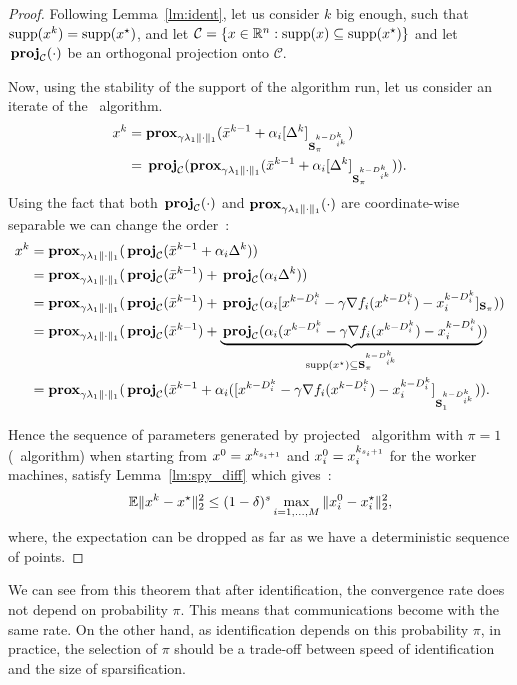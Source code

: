 \begin{proof}
Following Lemma~\ref{lm:ident}, let us consider $k$ big enough, such that $\mathrm{supp}(x^k) = \mathrm{supp}(x^\star)$, and let $\mathcal{C} = \{x\in\mathbb{R}^n:\mathrm{supp}(x)\subseteq\mathrm{supp}(x^\star)\}$
and let $\cproj(\cdot)$ be an orthogonal projection onto $\mathcal{C}$.

Now, using the stability of the support of the algorithm run, let us consider an iterate of the \SP~algorithm.
\begin{align*}
\w^k &= \lprox(\barw^{k-1} + \alpha_i[\Delta^k]_{\mask^{k-D_{i^k}^k}}) \\
&= \cproj(\lprox(\barw^{k-1} + \alpha_i[\Delta^k]_{\mask^{k-D_{i^k}^k}})).
\end{align*}
Using the fact that both $\cproj(\cdot)$ and $\mathbf{prox}_{\gamma \lambda_1\|\cdot\|_1}(\cdot)$ are coordinate-wise separable we can change the order~:
\begin{align*}\label{eq:projected_algo}
 \w^k &= \lprox(\cproj(\barw^{k-1} + \alpha_i\Delta^k))\nonumber\\
 &= \lprox(\cproj(\barw^{k-1}) + \cproj(\alpha_i\Delta^k))\nonumber\\
 &= \lprox(\cproj(\barw^{k-1}) + \cproj(\alpha_i[  \w^{k-D_i^k} - \gamma \nabla f_i( \w^{k-D_i^k}) - \w_i^{k-D_i^k}]_{\mask}))\nonumber\\
 &  = \lprox(\cproj(\barw^{k-1}) + \underbrace{\cproj(\alpha_i(\w^{k-D_i^k} - \gamma \nabla f_i( \w^{k-D_i^k}) - \w_i^{k-D_i^k})}_{\supp(x^\star)\subseteq \mask^{k-D_{i^k}^k}})\nonumber\\
 & = \lprox(\cproj(\barw^{k-1} + \alpha_i([\w^{k-D_i^k} - \gamma \nabla f_i( \w^{k-D_i^k}) - \w_i^{k-D_i^k}]_{\fullmask^{k-D_{i^k}^k}})).
\end{align*}

Hence the sequence of parameters generated by projected \SP~algorithm with $\pi = 1$ (\dave~algorithm) when starting from $x^0 = x^{k_{s_i+1}}$ and  $x^0_i = x_i^{k_{s_i+1}}$ for the worker machines, satisfy Lemma~\ref{lm:spy_diff} which gives~: 
\[
\mathbb{E}\|x^k-x^\star\|_2^2\leq(1-\delta)^s\max_{i=1,\dots,M}\|x_i^0-x_i^\star\|_2^2,
\]
where, the expectation can be dropped as far as we have a deterministic sequence of points.
\end{proof}

We can see from this theorem that after identification, the convergence rate does not depend on probability $\pi$. This means that communications become  with the same rate. On the other hand, as identification depends on this probability $\pi$, in practice, the selection of $\pi$ should be a trade-off between speed of identification and the size of sparsification.
